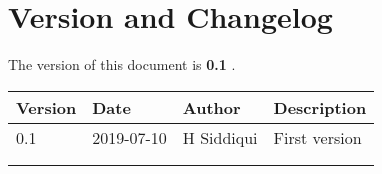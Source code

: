 \section{Version and Changelog}

The version of this document is {\bf 0.1} .

\begin{table}[H]
    \begin{tabular}{|l|l|l|p{10cm}| }
    \hline
    {\bf Version} & {\bf Date} & {\bf Author} & {\bf Description} \\ \hline
    0.1 & 2019-07-10 & H Siddiqui & First version \\ \hline
    \rowcolor[HTML]{EFEFEF} 
     &  &  &  \\ \hline
     &  &  &  \\ \hline
    \end{tabular}
\end{table}
